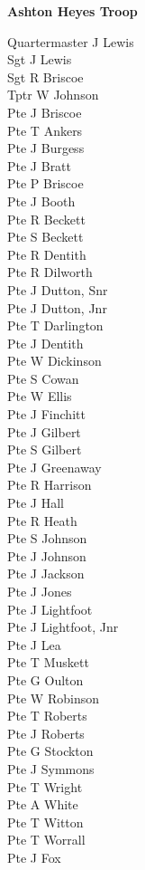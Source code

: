 \vspace*{10mm}

\begin{center}
  \Large
  \textbf{Ashton Heyes Troop}
\end{center}

\begin{multicols}{3}
  \small
  \noindent
  Quartermaster J Lewis \\
  Sgt J Lewis \\
  Sgt R Briscoe \\
  Tptr W Johnson \\
  Pte J Briscoe \\
  Pte T Ankers \\
  Pte J Burgess \\
  Pte J Bratt \\
  Pte P Briscoe \\
  Pte J Booth \\
  Pte R Beckett \\
  Pte S Beckett \\
  Pte R Dentith \\
  Pte R Dilworth \\
  Pte J Dutton, Snr \\
  Pte J Dutton, Jnr \\
  Pte T Darlington \\
  Pte J Dentith \\
  Pte W Dickinson \\
  Pte S Cowan \\
  Pte W Ellis \\
  Pte J Finchitt \\
  Pte J Gilbert \\
  Pte S Gilbert \\
  Pte J Greenaway \\
  Pte R Harrison \\
  Pte J Hall \\
  Pte R Heath \\
  Pte S Johnson \\
  Pte J Johnson \\
  Pte J Jackson \\
  Pte J Jones \\
  Pte J Lightfoot \\
  Pte J Lightfoot, Jnr \\
  Pte J Lea \\
  Pte T Muskett \\
  Pte G Oulton \\
  Pte W Robinson \\
  Pte T Roberts \\
  Pte J Roberts \\
  Pte G Stockton \\
  Pte J Symmons \\
  Pte T Wright \\
  Pte A White \\
  Pte T Witton \\
  Pte T Worrall \\
  Pte J Fox \\
\end{multicols}

